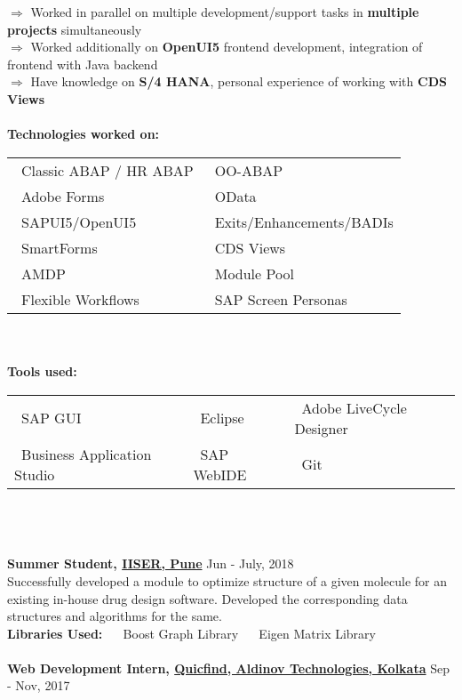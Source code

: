 \documentclass[margin, centered, a4paper]{res}
\begin{document}
\begin{resume}
$\Rightarrow$ Worked in parallel on multiple development/support tasks in \textbf{multiple projects} simultaneously\\
$\Rightarrow$ Worked additionally on \textbf{OpenUI5} frontend development, integration of frontend with Java backend\\
$\Rightarrow$ Have knowledge on \textbf{S/4 HANA}, personal experience of working with \textbf{CDS Views}\\
\\
\textbf{Technologies worked on:} \begin{tabular}{ l l }
	\textbullet~Classic ABAP / HR ABAP & \textbullet~OO-ABAP\\
	\textbullet~Adobe Forms & \textbullet~OData\\
	\textbullet~SAPUI5/OpenUI5 & \textbullet~Exits/Enhancements/BADIs\\
	\textbullet~SmartForms & \textbullet~CDS Views\\
	\textbullet~AMDP & \textbullet~Module Pool\\
	\textbullet~Flexible Workflows & \textbullet~SAP Screen Personas\\
\end{tabular}\\
\\
\textbf{Tools used:} \begin{tabular}{ l l l }
	\textbullet~SAP GUI & \textbullet~Eclipse & \textbullet~Adobe LiveCycle Designer\\
	\textbullet~Business Application Studio & \textbullet~SAP WebIDE & \textbullet~Git\\
\end{tabular}\\
\\
\\
\textbf{Summer Student, \href{http://www.iiserpune.ac.in/}{IISER, Pune}} \hfill{Jun - July, 2018}\\
Successfully developed a module to optimize structure of a given molecule for an existing in-house drug design software. Developed the corresponding data structures and algorithms for the same.\\
\textbf{Libraries Used:} ~\textbullet~ Boost Graph Library ~\textbullet~ Eigen Matrix Library\\
\\
\textbf{Web Development Intern, \href{http://www.quicfind.com}{Quicfind, Aldinov Technologies, Kolkata}} \hfill Sep - Nov, 2017\\

\end{resume}
\end{document}
